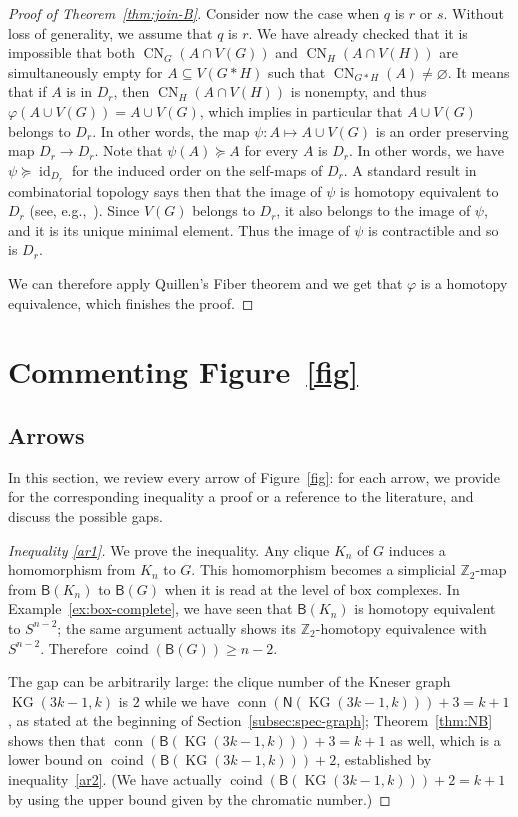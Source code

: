\documentclass[12pt]{amsart}
\theoremstyle{definition}
\def\Z{\mathbb{Z}}
\def\B{\mathsf{B}}
\def\N{\mathsf{N}}
\renewcommand{\geq}{\geqslant}
\renewcommand{\succeq}{\succcurlyeq}
\def\CN{\operatorname{CN}}
\def\KG{\operatorname{KG}}
\def\conn{\operatorname{conn}}
\def\coind{\operatorname{coind}}
\begin{document}
\begin{proof}[Proof of Theorem~\ref{thm:join-B}]
Consider now the case when $q$ is $r$ or $s$. Without loss of generality, we assume that $q$ is $r$. We have already checked that it is impossible that both $\CN_{G}(A\cap V(G))$ and $\CN_{H}(A\cap V(H))$ are simultaneously empty for $A \subseteq V(G*H)$ such that $\CN_{G*H}(A)\neq\varnothing$. It means that if $A$ is in $D_r$, then $\CN_{H}(A\cap V(H))$ is nonempty, and thus $\varphi(A \cup V(G)) = A \cup V(G)$, which implies in particular that $A \cup V(G)$ belongs to $D_r$. In other words, the map $\psi\colon A \mapsto A \cup V(G)$ is an order preserving map $D_r \rightarrow D_r$. Note that $\psi(A) \succeq A$ for every $A$ is $D_r$. In other words, we have $\psi \succeq \operatorname{id}_{D_r}$ for the induced order on the self-maps of $D_r$. A standard result in combinatorial topology says then that the image of $\psi$ is homotopy equivalent to $D_r$ (see, e.g.,~\cite[Proposition 12]{vzivaljevic2005wi}). Since $V(G)$ belongs to $D_r$, it also belongs to the image of $\psi$, and it is its unique minimal element. Thus the image of $\psi$ is contractible and so is $D_r$.

We can therefore apply Quillen's Fiber theorem and we get that $\varphi$ is a homotopy equivalence, which finishes the proof.
\end{proof}


\section{Commenting Figure~\ref{fig}}\label{sec:comment}

\subsection{Arrows}\label{subsec:arrows} In this section, we review every arrow of Figure~\ref{fig}: for each arrow, we provide for the corresponding inequality a proof or a reference to the literature, and discuss the possible gaps.

\begin{proof}[Inequality \eqref{ar1}]
We prove the inequality. Any clique $K_n$ of $G$ induces a homomorphism from $K_n$ to $G$. This homomorphism becomes a simplicial $\Z_2$-map from $\B(K_n)$ to $\B(G)$ when it is read at the level of box complexes. In Example~\ref{ex:box-complete}, we have seen that $\B(K_n)$ is homotopy equivalent to $S^{n-2}$; the same argument actually shows its $\Z_2$-homotopy equivalence with $S^{n-2}$. Therefore $\coind(\B(G)) \geq n-2$.

The gap can be arbitrarily large: the clique number of the Kneser graph $\KG(3k-1,k)$ is $2$ while we have $\conn(\N(\KG(3k-1,k)))+3 = k+1$, as stated at the beginning of Section~\ref{subsec:spec-graph}; Theorem~\ref{thm:NB} shows then that $\conn(\B(\KG(3k-1,k)))+3 = k+1$ as well, which is a lower bound on $\coind{(\B(\KG(3k-1,k)))}+2$, established by inequality~\eqref{ar2}. (We have actually $\coind{(\B(\KG(3k-1,k)))}+2 = k+1$ by using the upper bound given by the chromatic number.)
\end{proof}
\end{document}
